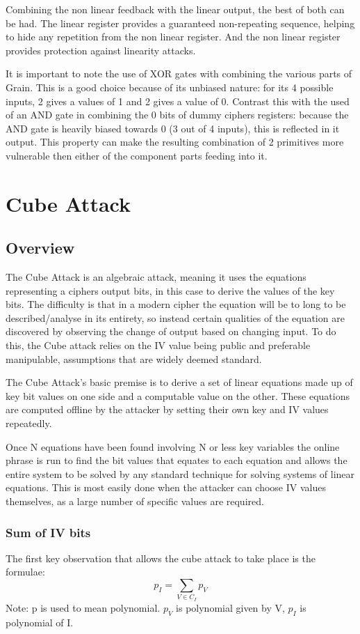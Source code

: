 \documentclass{report}
\let\Oldsection\section
\renewcommand{\section}{\FloatBarrier\Oldsection}
\let\Oldsubsection\subsection
\renewcommand{\subsection}{\FloatBarrier\Oldsubsection}
\begin{document}
Combining the non linear feedback with the linear output, the best of both can be had. The linear register provides a guaranteed non-repeating sequence, helping to hide any repetition from the non linear register. And the non linear register provides protection against linearity attacks.

It is important to note the use of XOR gates with combining the various parts of Grain. This is a good choice because of its unbiased nature: for its 4 possible inputs, 2 gives a values of 1 and 2 gives a value of 0. Contrast this with the used of an AND gate in combining the 0 bits of dummy ciphers registers: because the AND gate is heavily biased towards 0 (3 out of 4 inputs), this is reflected in it output. This property can make the resulting combination of 2 primitives more vulnerable then either of the component parts feeding into it.%


\chapter{Cube Attack}
\section{Overview}
The Cube Attack is an algebraic attack, meaning it uses the equations representing a ciphers output bits, in this case to derive the values of the key bits. The difficulty is that in a modern cipher the equation will be to long to be described/analyse in its entirety, so instead certain qualities of the equation are discovered by observing the change of output based on changing input. To do this, the Cube attack relies on the IV value being public and preferable manipulable, assumptions that are widely deemed standard. %

The Cube Attack's basic premise is to derive a set of linear equations made up of key bit values on one side and a computable value on the other. These equations are computed offline by the attacker by setting their own key and IV values repeatedly.

Once N equations have been found involving N or less key variables the online phrase is run to find the bit values that equates to each equation and allows the entire system to be solved by any standard technique for solving systems of linear equations. %
This is most easily done when the attacker can choose IV values themselves, as a large number of specific values are required.
\subsection{Sum of IV bits}
The first key observation that allows the cube attack to take place is the formulae:
\begin{equation} \label{eq:poly_sum}
p_I = \sum\limits_{V \in C_I} p_V 
\end{equation}
Note: p is used to mean polynomial. $p_V$ is polynomial given by V, $p_I$ is polynomial of I.
\end{document}
